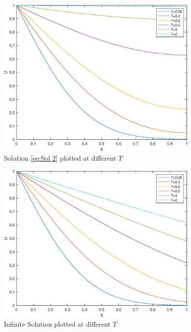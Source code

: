 \documentclass[10pt,a4paper,notitlepage]{article}
\begin{document}
\begin{figure}[H]
\begin{center}
\includegraphics[width=10cm]{Image_2_1_2}
\caption{Solution \eqref{eq:Sol 2} plotted at different $T$}
\end{center}
\end{figure}

\begin{figure}[H]
\begin{center}
\includegraphics[width=10cm]{Image_2_1_3}
\caption{Infinite Solution plotted at different $T$}\label{fg:ExactSol2}
\end{center}
\end{figure}
\end{document}
